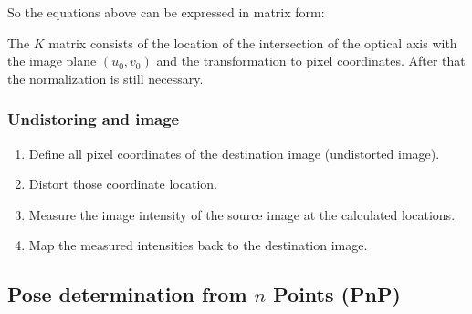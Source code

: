 \documentclass[10pt,a4paper]{scrartcl}
\begin{document}
\begin{multicols*}{2}
\begin{enumerate}
So the equations above can be expressed in matrix form:


The $K$ matrix consists of the location of the intersection of the optical axis with the image plane $(u_0,v_0)$ and the transformation to pixel coordinates. After that the normalization is still necessary.
\end{enumerate}

\subsubsection{Undistoring and image}

\begin{enumerate}
\item Define all pixel coordinates of the destination image (undistorted image).
\item Distort those coordinate location.
\item Measure the image intensity of the source image at the calculated locations.
\item Map the measured intensities back to the destination image.
\end{enumerate}

\subsection{Pose determination from $n$ Points (PnP)}


\end{multicols*}
\end{document}
